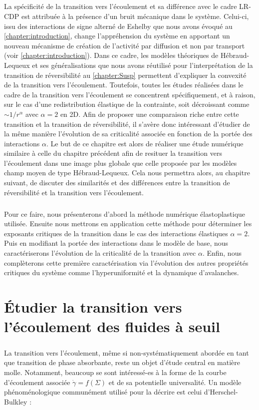 \subparagraph{}La spécificité de la transition vers l'écoulement et sa différence avec le cadre LR-CDP est attribuée à la présence d'un bruit mécanique dans le système. Celui-ci, issu des interactions de signe alterné de Eshelby que nous avons évoqué au \autoref{chapter:introduction}, change l'appréhension du système en apportant un nouveau mécanisme de création de l'activité par diffusion et non par transport (voir \autoref{chapter:introduction}). Dans ce cadre, les modèles théoriques de Hébraud-Lequeux et ses généralisations que nous avons réutilisé pour l'interprétation de la transition de réversibilité au  \autoref{chapter:Susp} permettent d'expliquer la convexité de la transition vers l'écoulement. Toutefois, toutes les études réalisées dans le cadre de la transition vers l'écoulement se concentrent spécifiquement, et à raison, sur le cas d'une redistribution élastique de la contrainte, soit décroissant comme $\sim 1/r^\alpha$ avec $\alpha = 2$ en 2D. Afin de proposer une comparaison riche entre cette transition et la transition de réversibilité, il s'avère donc intéressant d'étudier de la même manière l'évolution de sa criticalité associée en fonction de la portée des interactions $\alpha$. Le but de ce chapitre est alors de réaliser une étude numérique similaire à celle du chapitre précédent afin de resituer la transition vers l'écoulement dans une image plus globale que celle proposée par les modèles champ moyen de type Hébraud-Lequeux. Cela nous permettra alors, au chapitre suivant, de discuter des similarités et des différences entre la transition de réversibilité et la transition vers l'écoulement.

\subparagraph{}Pour ce faire, nous présenterons d'abord la méthode numérique élastoplastique utilisée. Ensuite nous mettrons en application cette méthode pour déterminer les exposants critiques de la transition dans le cas des interactions élastiques $\alpha=2$. Puis en modifiant la portée des interactions dans le modèle de base, nous caractériserons l'évolution de la criticalité de la transition avec $\alpha$. Enfin, nous complèterons cette première caractérisation via l'évolution des autres propriétés critiques du système comme l'hyperuniformité et la dynamique d'avalanches.

\section{Étudier la transition vers l'écoulement des fluides à seuil}

\subparagraph{}La transition vers l'écoulement, même si non-systématiquement abordée en tant que transition de phase absorbante, reste un objet d'étude central en matière molle. Notamment, beaucoup se sont intéressé-es à la forme de la courbe d'écoulement associée $\dot{\gamma} = f(\Sigma)$ et de sa potentielle universalité. Un modèle phénoménologique communément utilisé pour la décrire est celui d'Herschel-Bulkley \cite{herschel_konsistenzmessungen_1926} :

